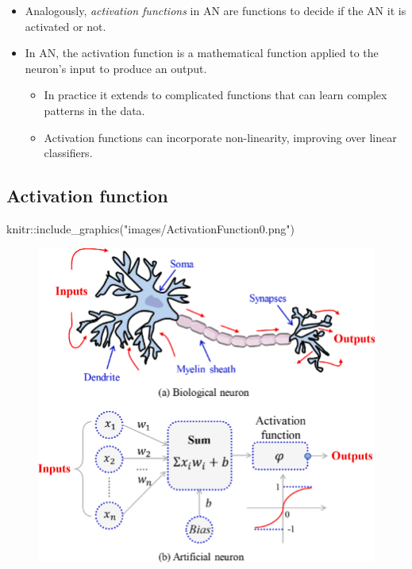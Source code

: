 \documentclass[
  letterpaper,
  DIV=11,
  numbers=noendperiod]{scrartcl}
\newenvironment{Shaded}{\begin{snugshade}}{\end{snugshade}}
\newcommand{\FunctionTok}[1]{\textcolor[rgb]{0.28,0.35,0.67}{#1}}
\newcommand{\NormalTok}[1]{\textcolor[rgb]{0.00,0.23,0.31}{#1}}
\newcommand{\SpecialCharTok}[1]{\textcolor[rgb]{0.37,0.37,0.37}{#1}}
\newcommand{\StringTok}[1]{\textcolor[rgb]{0.13,0.47,0.30}{#1}}
\providecommand{\tightlist}{%
  \setlength{\itemsep}{0pt}\setlength{\parskip}{0pt}}\usepackage{longtable,booktabs,array}
\begin{document}
\begin{itemize}
\tightlist
\item
  Analogously, \emph{activation functions} in AN are functions to decide
  if the AN it is activated or not.
\item
  In AN, the activation function is a mathematical function applied to
  the neuron's input to produce an output.

  \begin{itemize}
  \tightlist
  \item
    In practice it extends to complicated functions that can learn
    complex patterns in the data.
  \item
    Activation functions can incorporate non-linearity, improving over
    linear classifiers.
  \end{itemize}
\end{itemize}

\hypertarget{activation-function}{%
\subsection{Activation function}\label{activation-function}}

\begin{Shaded}
\begin{Highlighting}[]
\NormalTok{knitr}\SpecialCharTok{::}\FunctionTok{include\_graphics}\NormalTok{(}\StringTok{"images/ActivationFunction0.png"}\NormalTok{)}
\end{Highlighting}
\end{Shaded}

\begin{figure}[H]

{\centering \includegraphics[width=1\textwidth,height=\textheight]{images/ActivationFunction0.png}

}

\end{figure}
\end{document}
